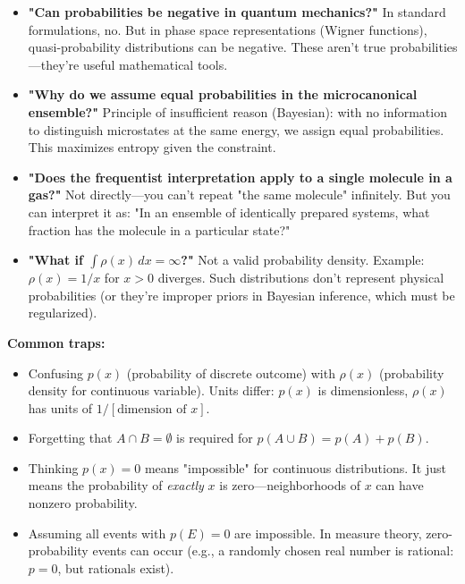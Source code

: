\documentclass[9pt,twocoloumn]{article}
\begin{document}
\begin{itemize}
    \item \textbf{"Can probabilities be negative in quantum mechanics?"} In standard formulations, no. But in phase space representations (Wigner functions), quasi-probability distributions can be negative. These aren't true probabilities—they're useful mathematical tools.
    
    \item \textbf{"Why do we assume equal probabilities in the microcanonical ensemble?"} Principle of insufficient reason (Bayesian): with no information to distinguish microstates at the same energy, we assign equal probabilities. This maximizes entropy given the constraint.
    
    \item \textbf{"Does the frequentist interpretation apply to a single molecule in a gas?"} Not directly—you can't repeat "the same molecule" infinitely. But you can interpret it as: "In an ensemble of identically prepared systems, what fraction has the molecule in a particular state?"
    
    \item \textbf{"What if $\int \rho(x) \, dx = \infty$?"} Not a valid probability density. Example: $\rho(x) = 1/x$ for $x > 0$ diverges. Such distributions don't represent physical probabilities (or they're improper priors in Bayesian inference, which must be regularized).
\end{itemize}

\textbf{Common traps:}

\begin{itemize}
    \item Confusing $p(x)$ (probability of discrete outcome) with $\rho(x)$ (probability density for continuous variable). Units differ: $p(x)$ is dimensionless, $\rho(x)$ has units of $1/[\text{dimension of } x]$.
    \item Forgetting that $A \cap B = \emptyset$ is required for $p(A \cup B) = p(A) + p(B)$.
    \item Thinking $p(x) = 0$ means "impossible" for continuous distributions. It just means the probability of \emph{exactly} $x$ is zero—neighborhoods of $x$ can have nonzero probability.
    \item Assuming all events with $p(E) = 0$ are impossible. In measure theory, zero-probability events can occur (e.g., a randomly chosen real number is rational: $p = 0$, but rationals exist).
\end{itemize}
\end{document}
